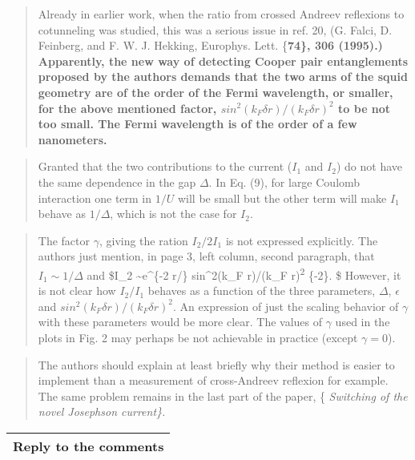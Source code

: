 \documentclass[11pt]{article}
\begin{document}
\begin{quote}
Already in earlier work, when the ratio from crossed Andreev reflexions
to cotunneling was studied, this was a serious issue in ref. 20, (G.
Falci, D. Feinberg, and F. W. J. Hekking, Europhys. Lett. \{\bf 74\},
306 (1995).) Apparently, the new way of detecting Cooper pair
entanglements proposed by the authors demands that the two arms of the
squid geometry are of the order of the Fermi wavelength, or smaller, for
the above mentioned factor, \(sin^2(k_F \delta r)/(k_F \delta r)^2\) to
be not too small. The Fermi wavelength is of the order of a few
nanometers.
\end{quote}

\begin{quote}
Granted that the two contributions to the current (\(I_1\) and \(I_2\))
do not have the same dependence in the gap \(\Delta\). In Eq. (9), for
large Coulomb interaction one term in \(1/U\) will be small but the
other term will make \(I_1\) behave as \(1/\Delta\), which is not the
case for \(I_2\).
\end{quote}

\begin{quote}
The factor \(\gamma\), giving the ration \(I_2/2I_1\) is not expressed
explicitly. The authors just mention, in page 3, left column, second
paragraph, that \(I_1 \sim 1/\Delta\) and \$I\_2 \sim e\^{}\{-2
\delta r/\pi \Delta\} sin\^{}2(k\_F \delta r)/(k\_F
\delta r)\textsuperscript{2 \epsilon}\{-2\}. \$ However, it is not clear
how \(I_2/I_1\) behaves as a function of the three parameters,
\(\Delta\), \(\epsilon\) and \(sin^2(k_F \delta r)/(k_F \delta r)^2\).
An expression of just the scaling behavior of \(\gamma\) with these
parameters would be more clear. The values of \(\gamma\) used in the
plots in Fig. 2 may perhaps be not achievable in practice (except
\(\gamma=0\)).
\end{quote}

\begin{quote}
The authors should explain at least briefly why their method is easier
to implement than a measurement of cross-Andreev reflexion for example.
The same problem remains in the last part of the paper, \{\it
Switching of the novel Josephson current\}.
\end{quote}

\begin{longtable}[]{@{}l@{}}
\toprule
\endhead
Reply to the comments\tabularnewline
\bottomrule
\end{longtable}
\end{document}
